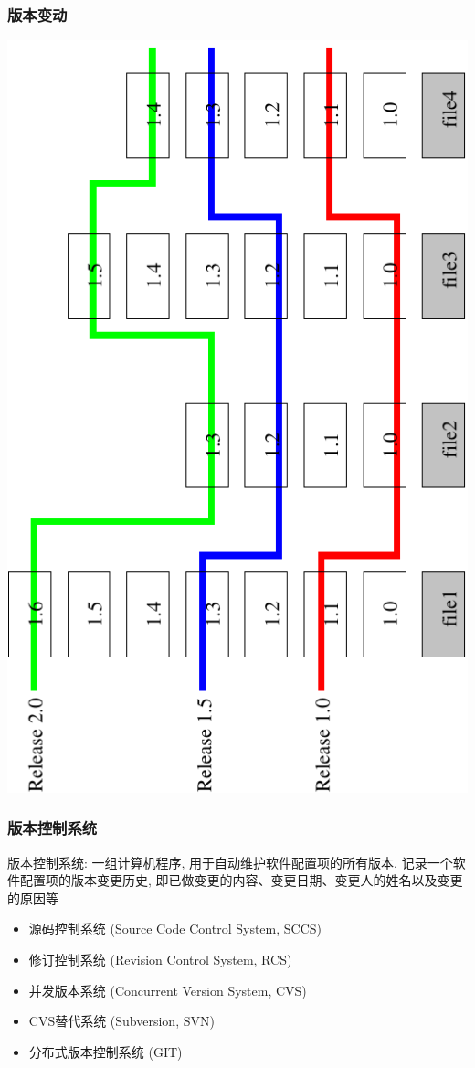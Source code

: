 \documentclass[compress]{beamer}
\begin{document}
\begin{frame}
\frametitle{版本变动}

\includegraphics[angle=-90,width=\hsize]{revision.pdf}

\end{frame}

\begin{frame}
\frametitle{版本控制系统}

版本控制系统: 一组计算机程序, 用于自动维护软件配置项的所有版本, 记录一个软件配置项的版本变更历史,
即已做变更的内容、变更日期、变更人的姓名以及变更的原因等

\begin{itemize}
\item 源码控制系统 (Source Code Control System, SCCS)
\item 修订控制系统 (Revision Control System, RCS)
\item 并发版本系统 (Concurrent Version System, CVS)
\item CVS替代系统 (Subversion, SVN)
\item 分布式版本控制系统 (GIT)
\end{itemize}
\end{frame}
\end{document}
